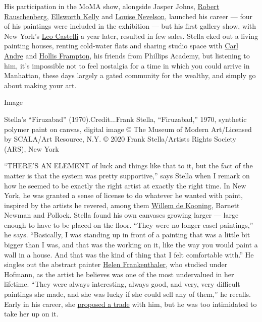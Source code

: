 His participation in the MoMA show, alongside Jasper Johns,
\href{https://www.nytimes3xbfgragh.onion/2015/06/03/t-magazine/robert-rauschenberg-endless-combinations.html}{Robert
Rauschenberg},
\href{https://www.nytimes3xbfgragh.onion/2018/02/08/t-magazine/ellsworth-kelly-austin-last-work.html}{Ellsworth
Kelly} and
\href{https://www.nytimes3xbfgragh.onion/1988/04/18/obituaries/louise-nevelson-artist-renowned-for-wall-sculptures-is-dead-at-88.html}{Louise
Nevelson}, launched his career --- four of his paintings were included
in the exhibition --- but his first gallery show, with New York's
\href{https://www.castelligallery.com/}{Leo Castelli} a year later,
resulted in few sales. Stella eked out a living painting houses, renting
cold-water flats and sharing studio space with
\href{https://www.nytimes3xbfgragh.onion/2011/07/17/arts/design/carl-andres-work-is-the-subject-of-a-new-book-and-show.html}{Carl
Andre} and
\href{https://www.nytimes3xbfgragh.onion/1984/04/03/obituaries/hollis-frampton-dead-at-48-film-maker-photographer.html}{Hollis
Frampton}, his friends from Phillips Academy, but listening to him, it's
impossible not to feel nostalgia for a time in which you could arrive in
Manhattan, these days largely a gated community for the wealthy, and
simply go about making your art.

Image

Stella's ``Firuzabad'' (1970).Credit...Frank Stella, ``Firuzabad,''
1970, synthetic polymer paint on canvas, digital image © The Museum of
Modern Art/Licensed by SCALA/Art Resource, N.Y. © 2020 Frank
Stella/Artists Rights Society (ARS), New York

``THERE'S AN ELEMENT of luck and things like that to it, but the fact of
the matter is that the system was pretty supportive,'' says Stella when
I remark on how he seemed to be exactly the right artist at exactly the
right time. In New York, he was granted a sense of license to do
whatever he wanted with paint, inspired by the artists he revered, among
them
\href{https://www.nytimes3xbfgragh.onion/topic/person/willem-de-kooning}{Willem
de Kooning}, Barnett Newman and Pollock. Stella found his own canvases
growing larger --- large enough to have to be placed on the floor.
``They were no longer easel paintings,'' he says. ``Basically, I was
standing up in front of a painting that was a little bit bigger than I
was, and that was the working on it, like the way you would paint a wall
in a house. And that was the kind of thing that I felt comfortable
with.'' He singles out the abstract painter
\href{https://www.nytimes3xbfgragh.onion/topic/person/helen-frankenthaler}{Helen
Frankenthaler}, who studied under Hofmann, as the artist he believes was
one of the most undervalued in her lifetime. ``They were always
interesting, always good, and very, very difficult paintings she made,
and she was lucky if she could sell any of them,'' he recalls. Early in
his career, she
\href{https://www.nytimes3xbfgragh.onion/2019/10/08/t-magazine/artist-trades.html}{proposed
a trade} with him, but he was too intimidated to take her up on it.

